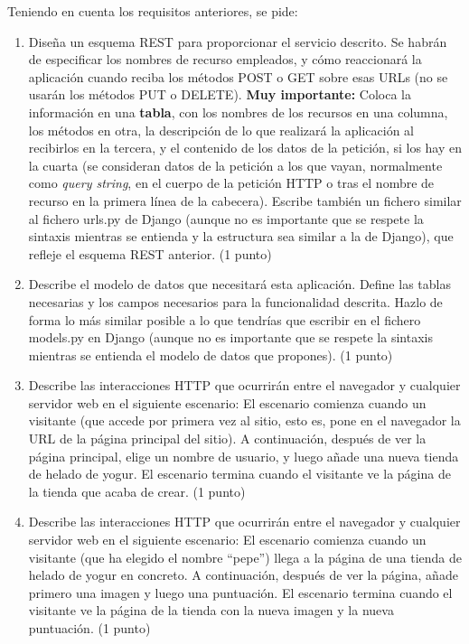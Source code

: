 \newpage

Teniendo en cuenta los requisitos anteriores, se pide:

\begin{enumerate}
    \item Diseña un esquema REST para proporcionar el servicio descrito. Se habrán de especificar los nombres de recurso empleados, y cómo reaccionará la aplicación cuando reciba los métodos POST o GET sobre esas URLs (no se usarán los métodos PUT o DELETE). \textbf{Muy importante:} Coloca la información en una \textbf{tabla}, con los nombres de los recursos en una columna, los métodos en otra, la descripción de lo que realizará la aplicación al recibirlos en la tercera, y el contenido de los datos de la petición, si los hay en la cuarta (se consideran datos de la petición a los que vayan, normalmente como \emph{query string}, en el cuerpo de la petición HTTP o tras el nombre de recurso en la primera línea de la cabecera). Escribe también un fichero similar al fichero urls.py de Django (aunque no es importante que se respete la sintaxis mientras se entienda y la estructura sea similar a la de Django), que refleje el esquema REST anterior. (1 punto)

    \item Describe el modelo de datos que necesitará esta aplicación. Define las tablas necesarias y los campos necesarios para la funcionalidad descrita. Hazlo de forma lo más similar posible a lo que tendrías que escribir en el fichero models.py en Django (aunque no es importante que se respete la sintaxis mientras se entienda el modelo de datos que propones). (1 punto)

    \item Describe las interacciones HTTP que ocurrirán entre el navegador y cualquier servidor web en el siguiente escenario: El escenario comienza cuando un visitante (que accede por primera vez al sitio, esto es, pone en el navegador la URL de la página principal del sitio). A continuación, después de ver la página principal, elige un nombre de usuario, y luego añade una nueva tienda de helado de yogur. El escenario termina cuando el visitante ve la página de la tienda que acaba de crear. (1 punto)

    \item Describe las interacciones HTTP que ocurrirán entre el navegador y cualquier servidor web en el siguiente escenario: El escenario comienza cuando un visitante (que ha elegido el nombre ``pepe'') llega a la página de una tienda de helado de yogur en concreto. A continuación, después de ver la página, añade primero una imagen y luego una puntuación. El escenario termina cuando el visitante ve la página de la tienda con la nueva imagen y la nueva puntuación. (1 punto)


\end{enumerate}
